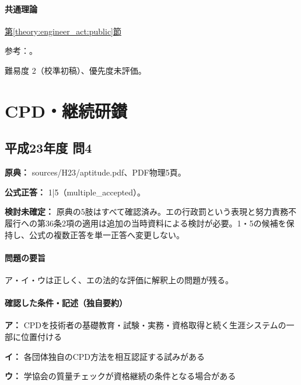 \paragraph{共通理論} \hyperref[theory:engineer_act:public]{第\ref*{theory:engineer_act:public}節}

\par 参考：\cite{engineer_act_current,cpd_v3}。

\par 難易度 2（校準初稿）、優先度未評価。

\section{CPD・継続研鑚}

\subsection{平成23年度 問4}
\label{q:h23-reg-apt-04}

\noindent\textbf{原典：} sources/H23/aptitude.pdf、PDF物理5頁。

\textbf{公式正答：} 1|5（multiple\_accepted）。

\par\textbf{検討未確定：} 原典の5肢はすべて確認済み。エの行政罰という表現と努力責務不履行への第36条2項の適用は追加の当時資料による検討が必要。1・5の候補を保持し、公式の複数正答を単一正答へ変更しない。

\paragraph{問題の要旨} ア・イ・ウは正しく、エの法的な評価に解釈上の問題が残る。

\paragraph{確認した条件・記述（独自要約）}\mbox{}\par

\noindent\textbf{ア：} CPDを技術者の基礎教育・試験・実務・資格取得と続く生涯システムの一部に位置付ける\par

\noindent\textbf{イ：} 各団体独自のCPD方法を相互認証する試みがある\par

\noindent\textbf{ウ：} 学協会の質量チェックが資格継続の条件となる場合がある\par

